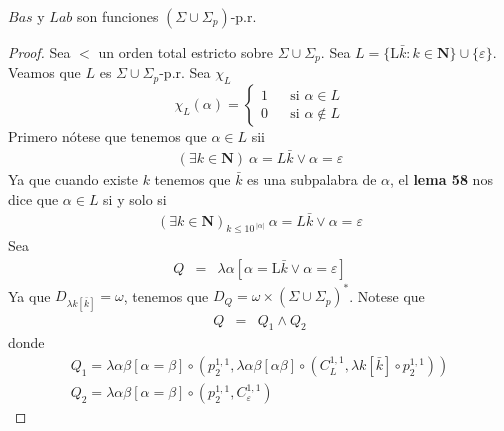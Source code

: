   \begin{lemma}
    $Bas$ y $Lab$ son funciones $(\Sigma \cup \Sigma _{p})$-p.r.

  \begin{proof}
    Sea $< $ un orden total estricto sobre $\Sigma \cup \Sigma _{p}$. Sea $L=\{ \mathrm{L}\bar{k}:k\in \mathbf{N}\}
    \cup \{\varepsilon \}$. Veamos que $ L $ es $\Sigma \cup \Sigma _{p}$-p.r.
    Sea $\chi_L$
    \[
      \displaystyle \chi_L(\alpha)=\left\{\begin{array}{lll}
                                            1 & & \text{si }\alpha\in L\\
                                            0 & & \text{si }\alpha\notin L
                                          \end{array}\right.
    \]
    Primero nótese que tenemos que $\alpha \in L$ sii
    \[
      \begin{array}{lll}
        (\exists k \in \mathbf{N})\ \alpha = L\bar{k} \lor \alpha = \varepsilon
      \end{array}
    \]
    Ya que cuando existe $k$ tenemos que $\bar{k}$ es una subpalabra de $\alpha $, el \textbf{lema 58} nos dice
    que $\alpha \in L$ si y solo si
    \[
      \begin{array}{lll}
        (\exists k \in \mathbf{N})_{k\leq 10^{\ \left\vert \alpha \right \vert}}\ \alpha = L\bar{k} \lor \alpha = \varepsilon
      \end{array}
    \]
    Sea
    \[
      \begin{array}{lll}
        Q & = & \lambda \alpha\left[
                                    \alpha = \mathrm{L}\bar{k} \lor \alpha = \varepsilon
                              \right]
      \end{array}
    \]
    Ya que $D_{\lambda k\left[ \bar{k}\right] }=\omega $, tenemos que
    $ D_{Q}=\omega \times (\Sigma \cup \Sigma _{p})^{\ast } $.
    Notese que
    \[
      \begin{array}{lll}
        Q & = & Q_1 \land Q_2
      \end{array}
    \]
    donde
    \[
      \begin{array}{lll}
        \displaystyle Q_1 = \lambda \alpha \beta \left[ \alpha =\beta \right] \circ
        \left( p_{2}^{1,1},
        \lambda \alpha \beta \left[ \alpha\beta \right] \circ (C_{L}^{1,1},\lambda k\left[ \bar{k}\right]
        \circ p_{2}^{1,1})
        \right) \\
        Q_2 = \lambda \alpha \beta \left[ \alpha =\beta \right] \circ (p_{2}^{1,1}, C_{\varepsilon}^{1,1})

\end{array}\]
\end{proof}
\end{lemma}
